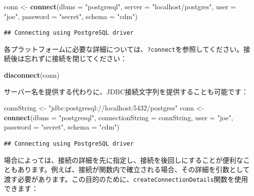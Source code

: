 \documentclass[
  11pt]{book}
\newenvironment{Shaded}{\begin{snugshade}}{\end{snugshade}}
\newcommand{\AttributeTok}[1]{\textcolor[rgb]{0.13,0.29,0.53}{#1}}
\newcommand{\FunctionTok}[1]{\textcolor[rgb]{0.13,0.29,0.53}{\textbf{#1}}}
\newcommand{\NormalTok}[1]{#1}
\newcommand{\OtherTok}[1]{\textcolor[rgb]{0.56,0.35,0.01}{#1}}
\newcommand{\StringTok}[1]{\textcolor[rgb]{0.31,0.60,0.02}{#1}}
\theoremstyle{definition}
\theoremstyle{definition}
\theoremstyle{definition}
\theoremstyle{definition}
\theoremstyle{remark}
\begin{document}
\begin{Shaded}
\begin{Highlighting}[]
\NormalTok{conn }\OtherTok{\textless{}{-}} \FunctionTok{connect}\NormalTok{(}\AttributeTok{dbms =} \StringTok{"postgresql"}\NormalTok{,}
                \AttributeTok{server =} \StringTok{"localhost/postgres"}\NormalTok{,}
                \AttributeTok{user =} \StringTok{"joe"}\NormalTok{,}
                \AttributeTok{password =} \StringTok{"secret"}\NormalTok{,}
                \AttributeTok{schema =} \StringTok{"cdm"}\NormalTok{)}
\end{Highlighting}
\end{Shaded}

\begin{verbatim}
## Connecting using PostgreSQL driver
\end{verbatim}

各プラットフォームに必要な詳細については、\texttt{?connect}を参照してください。接続後は忘れずに接続を閉じてください：

\begin{Shaded}
\begin{Highlighting}[]
\FunctionTok{disconnect}\NormalTok{(conn)}
\end{Highlighting}
\end{Shaded}

サーバー名を提供する代わりに、JDBC接続文字列を提供することも可能です：

\begin{Shaded}
\begin{Highlighting}[]
\NormalTok{connString }\OtherTok{\textless{}{-}} \StringTok{"jdbc:postgresql://localhost:5432/postgres"}
\NormalTok{conn }\OtherTok{\textless{}{-}} \FunctionTok{connect}\NormalTok{(}\AttributeTok{dbms =} \StringTok{"postgresql"}\NormalTok{,}
                \AttributeTok{connectionString =}\NormalTok{ connString,}
                \AttributeTok{user =} \StringTok{"joe"}\NormalTok{,}
                \AttributeTok{password =} \StringTok{"secret"}\NormalTok{,}
                \AttributeTok{schema =} \StringTok{"cdm"}\NormalTok{)}
\end{Highlighting}
\end{Shaded}

\begin{verbatim}
## Connecting using PostgreSQL driver
\end{verbatim}

場合によっては、接続の詳細を先に指定し、接続を後回しにすることが便利なこともあります。例えば、接続が関数内で確立される場合、その詳細を引数として渡す必要があります。この目的のために、\texttt{createConnectionDetails}関数を使用できます：
\end{document}
